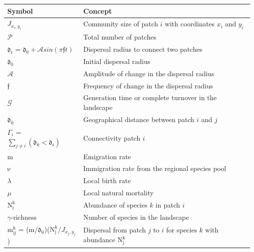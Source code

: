 \documentclass[12pt]{article}
\begin{document}
\newpage
\begin{table}[h]
\begin{tabular}{  p{5cm}  |  p{10cm} }
 \hline
  \textbf{Symbol} & \textbf{Concept}\\  \hline
  $J_{x_i,y_i}$ & Community size of patch $i$ with coordinates $x_i$ and $y_i$ \\ \hline
  $\mathcal{P}$ & Total number of patches \\ \hline
  $\mathfrak{d_{c}}$ = $\mathfrak{d_{0}} + \mathcal{A} sin (\pi \mathfrak{f} t)$ & Dispersal radius to connect two patches \\ \hline
  $\mathfrak{d_{0}}$ & Initial dispersal radius \\ \hline
  $\mathcal{A}$ & Amplitude of change in the dispersal radius \\ \hline
  $\mathfrak{f}$ & Frequency of change in the dispersal radius \\ \hline
  $\mathcal{G}$ & Generation time or complete turnover in the landscape \\ \hline
  $\mathfrak{d_{ij}}$ & Geographical distance between patch $i$ and $j$ \\ \hline
  $\Gamma_{i}$ = $\sum_{j \neq i} (\mathfrak{d_{ij}} < \mathfrak{d_{c}})$ & Connectivity patch $i$ \\ \hline
  $\mathrm{m}$ & Emigration rate \\ \hline
  $\mathrm{\nu}$ & Immigration rate from the regional species pool \\ \hline
  $\lambda$ & Local birth rate \\ \hline  $\mu$ & Local natural mortality \\ \hline
  $\mathrm{N^{k}_{i}}$ & Abundance of species $k$ in patch $i$ \\ \hline  
  $\gamma$-richness & Number of species in the landscape \\ \hline
  $\mathrm{m^{k}_{ij}}$ = ($\mathrm{m}$/$\mathfrak{d_{ij}}$)($\mathrm{N^{k}_{j}}$/$J_{x_j,y_j}$) & Dispersal from patch $j$ to $i$ for species $k$ with abundance $\mathrm{N^{k}_{j}}$ \\ \hline

\end{tabular}
\end{table}
\end{document}
